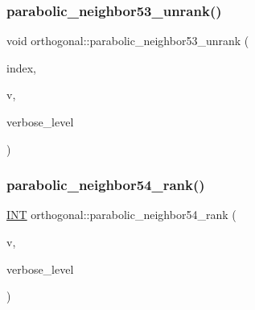 \mbox{\label{classorthogonal_ac3e1bc434ae9a96a712df77c226e2e04}} 
\subsubsection{\texorpdfstring{parabolic\+\_\+neighbor53\+\_\+unrank()}{parabolic\_neighbor53\_unrank()}}
{\footnotesize\ttfamily void orthogonal\+::parabolic\+\_\+neighbor53\+\_\+unrank (\begin{DoxyParamCaption}\item[{\mbox{\hyperlink{galois_8h_a09fddde158a3a20bd2dcadb609de11dc}{I\+NT}}}]{index,  }\item[{\mbox{\hyperlink{galois_8h_a09fddde158a3a20bd2dcadb609de11dc}{I\+NT}} $\ast$}]{v,  }\item[{\mbox{\hyperlink{galois_8h_a09fddde158a3a20bd2dcadb609de11dc}{I\+NT}}}]{verbose\+\_\+level }\end{DoxyParamCaption})}

\mbox{\label{classorthogonal_ab3955d88bdd66919788c3369d199ab99}} 
\subsubsection{\texorpdfstring{parabolic\+\_\+neighbor54\+\_\+rank()}{parabolic\_neighbor54\_rank()}}
{\footnotesize\ttfamily \mbox{\hyperlink{galois_8h_a09fddde158a3a20bd2dcadb609de11dc}{I\+NT}} orthogonal\+::parabolic\+\_\+neighbor54\+\_\+rank (\begin{DoxyParamCaption}\item[{\mbox{\hyperlink{galois_8h_a09fddde158a3a20bd2dcadb609de11dc}{I\+NT}} $\ast$}]{v,  }\item[{\mbox{\hyperlink{galois_8h_a09fddde158a3a20bd2dcadb609de11dc}{I\+NT}}}]{verbose\+\_\+level }\end{DoxyParamCaption})}

\mbox{\label{classorthogonal_a5792ec3d34c942a9d17b02308ced4345}} 
